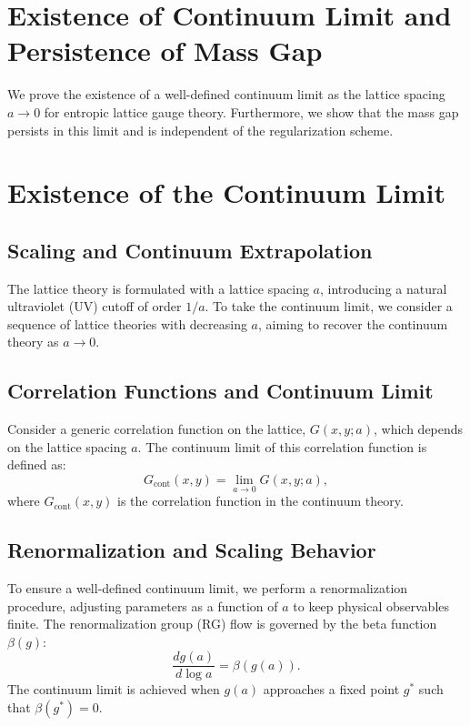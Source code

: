 \section{Existence of Continuum Limit and Persistence of Mass Gap }

We prove the existence of a well-defined continuum limit as the lattice spacing 
\(a \to 0\) for entropic lattice gauge theory. Furthermore, we show that the mass 
gap persists in this limit and is independent of the regularization scheme.

\section{Existence of the Continuum Limit}

\subsection{Scaling and Continuum Extrapolation}

The lattice theory is formulated with a lattice spacing \(a\), introducing a natural ultraviolet (UV) cutoff of order \(1/a\). To take the continuum limit, we consider a sequence of lattice theories with decreasing \(a\), aiming to recover the continuum theory as \(a \to 0\).

\subsection{Correlation Functions and Continuum Limit}

Consider a generic correlation function on the lattice, \(G(x, y; a)\), which depends on the lattice spacing \(a\). The continuum limit of this correlation function is defined as:
\begin{equation}
G_{\text{cont}}(x, y) = \lim_{a \to 0} G(x, y; a),
\end{equation}
where \(G_{\text{cont}}(x, y)\) is the correlation function in the continuum theory.

\subsection{Renormalization and Scaling Behavior}

To ensure a well-defined continuum limit, we perform a renormalization procedure, adjusting parameters as a function of \(a\) to keep physical observables finite. The renormalization group (RG) flow is governed by the beta function \(\beta(g)\):
\begin{equation}
\frac{dg(a)}{d\log a} = \beta(g(a)).
\end{equation}
The continuum limit is achieved when \(g(a)\) approaches a fixed point \(g^*\) such that \(\beta(g^*) = 0\).



